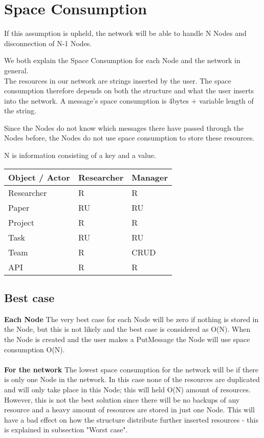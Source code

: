 \section{Space Consumption}
If this assumption is upheld, the network will be able to handle N Nodes and disconnection of N-1 Nodes.

We both explain the Space Consumption for each Node and the network in general.\\
The resources in our network are strings inserted by the user. The space consumption therefore depends on both the structure and what the user inserts into the network. A message's space consumption is 4bytes + variable length of the string. 

Since the Nodes do not know which messages there have passed through the Nodes before, the Nodes do not use space consumption to store these resources. 

N is information consisting of a key and a value.

\begin{center}
	\begin{tabular}{| l | l | l |}
		\hline
		Object / Actor & Researcher & Manager \\ \hline
		Researcher & R & R \\ \hline
		Paper & RU & RU \\ \hline
		Project & R & R \\ \hline
		Task & RU & RU  \\ \hline
		Team & R & CRUD \\ \hline
		API & R & R  \\
		\hline
	\end{tabular}
\end{center}

\subsection{Best case}
\textbf{Each Node}
The very best case for each Node will be zero if nothing is stored in the Node, but this is not likely and the best case is considered as O(N). When the Node is created and the user makes a PutMessage the Node will use space consumption O(N).\\\\ \textbf{For the network}
The lowest space consumption for the network will be if there is only one Node in the network. In this case none of the resources are duplicated and will only take place in this Node; this will held O(N) amount of resources. \\ However, this is not the best solution since there will be no backups of any resource and a heavy amount of resources are stored in just one Node. This will have a bad effect on how the structure distribute further inserted resources - this is explained in subsection "Worst case". \\ 

